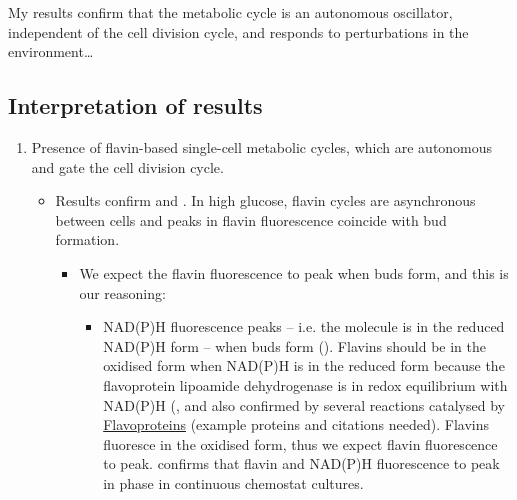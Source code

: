 My results confirm that the metabolic cycle is an autonomous oscillator, independent of the cell division cycle, and responds to perturbations in the environment\ldots{}

\subsection{Interpretation of results}
\label{subsec:biology-discussion-interpretation}
\begin{enumerate}
\item Presence of flavin-based single-cell metabolic cycles, which are autonomous and gate the cell division cycle.
\begin{itemize}
\item Results confirm \textcite{papagiannakisAutonomousMetabolicOscillations2017} and \textcite{baumgartnerFlavinbasedMetabolicCycles2018}.  In high glucose, flavin cycles are asynchronous between cells and peaks in flavin fluorescence coincide with bud formation.
\begin{itemize}
\item We expect the flavin fluorescence to peak when buds form, and this is our reasoning:
\begin{itemize}
\item NAD(P)H fluorescence peaks -- i.e. the molecule is in the reduced NAD(P)H form -- when buds form (\textcite{papagiannakisAutonomousMetabolicOscillations2017}).  Flavins should be in the oxidised form when NAD(P)H is in the reduced form because the flavoprotein lipoamide dehydrogenase is in redox equilibrium with NAD(P)H (\textcite{sianoNADHFlavinFluorescence1989}, and also confirmed by several reactions catalysed by \href{Flavoproteins.org}{Flavoproteins} (example proteins and citations needed).  Flavins fluoresce in the oxidised form, thus we expect flavin fluorescence to peak. \textcite{murrayRedoxRegulationRespiring2011} confirms that flavin and NAD(P)H fluorescence to peak in phase in continuous chemostat cultures.
\end{itemize}


\end{itemize}
\end{itemize}
\end{enumerate}
